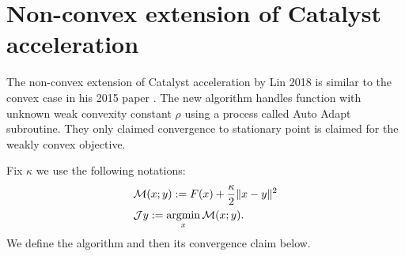 \documentclass[12pt]{article}
\begin{document}
\section{Non-convex extension of Catalyst acceleration}\label{sec:4wd-catalyst}
    The non-convex extension of Catalyst acceleration by Lin 2018 \cite{lin_catalyst_2018} is similar to the convex case in his 2015 paper \cite{lin_universal_2015}. 
    The new algorithm handles function with unknown weak convexity constant $\rho$ using a process called Auto Adapt subroutine. 
    They only claimed convergence to stationary point is claimed for the weakly convex objective. 
    \par 
    Fix $\kappa$ we use the following notations: 
    \begin{align*}
       & \mathcal M (x; y) := F(x) + \frac{\kappa}{2}\Vert x - y\Vert^2 
       \\
       & \mathcal J y := \mathop{\rm argmin}\limits_x \mathcal M (x; y). 
    \end{align*}
    We define the algorithm and then its convergence claim below. 
\end{document}
